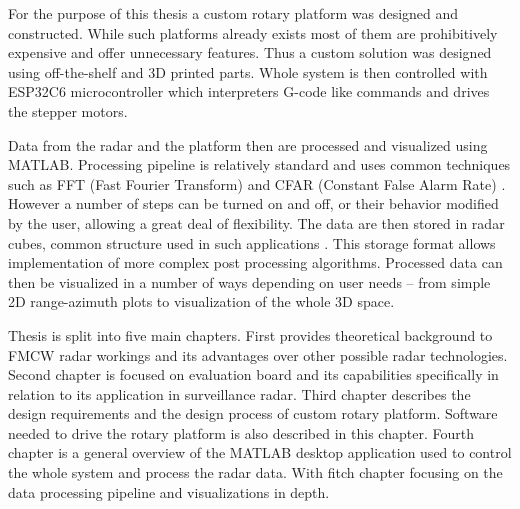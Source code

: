 For the purpose of this thesis a custom rotary platform was designed and constructed.
While such platforms already exists \cite{standa, carl} most of them are prohibitively expensive and offer unnecessary features.
Thus a custom solution was designed using off-the-shelf and 3D printed parts.
Whole system is then controlled with ESP32C6 microcontroller which interpreters G-code like commands and drives the stepper motors.

Data from the radar and the platform then are processed and visualized using MATLAB.
Processing pipeline is relatively standard and uses common techniques such as FFT (Fast Fourier Transform) and CFAR (Constant False Alarm Rate) \cite{richards2022}.
However a number of steps can be turned on and off, or their behavior modified by the user, allowing a great deal of flexibility.
The data are then stored in radar cubes, common structure used in such applications \cite{richards2022}.
This storage format allows implementation of more complex post processing algorithms.
Processed data can then be visualized in a number of ways depending on user needs -- from simple 2D range-azimuth plots to visualization of the whole 3D space.

Thesis is split into five main chapters.
First provides theoretical background to FMCW radar workings and its advantages over other possible radar technologies.
Second chapter is focused on \sidar evaluation board and its capabilities specifically in relation to its application in surveillance radar.
Third chapter describes the design requirements and the design process of custom rotary platform.
Software needed to drive the rotary platform is also described in this chapter.
Fourth chapter is a general overview of the MATLAB desktop application used to control the whole system and process the radar data.
With fitch chapter focusing on the data processing pipeline and visualizations in depth.
